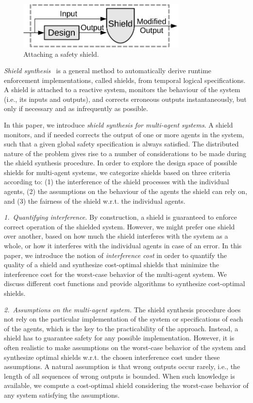 \begin{figure}
\centering
\includegraphics[width=0.75\textwidth]{MultiShield/figs/attach_shield}
\caption{Attaching a safety shield.}
\label{fig:attach_shield}
\vspace{-.3cm}
\end{figure}
\emph{Shield synthesis}~\cite{KonighoferABHKT17} is a general method to automatically derive runtime enforcement implementations, called shields,
from temporal logical specifications.
A shield is attached to a reactive system, monitors the behaviour of the system (i.e., its inputs and outputs), and corrects
erroneous outputs instantaneously, but only if necessary and as infrequently
as possible.


In this paper, we introduce \emph{shield synthesis for multi-agent systems}. A shield monitors, and if needed corrects the output of one or more agents in the system, such that a given global safety specification is always satisfied. The distributed nature of the problem gives rise to a number of considerations to be made during the shield synthesis procedure. In order to explore the design space of possible shields for multi-agent systems, we categorize shields based on three criteria according to:
(1) the interference of the shield processes with the individual agents,
(2) the assumptions on the behaviour of the agents the shield can rely on, and
(3) the fairness of the shield w.r.t. the individual agents.


\emph{1.\ Quantifying interference.}
By construction, a shield is guaranteed to enforce correct operation of the shielded system. However, we might prefer one shield over another, based on how much the shield interferes with the system as a whole, or how it interferes with the individual agents in case of an error. In this paper, we introduce the notion of  \emph{interference cost}
in order to quantify the quality of a shield
and synthesize cost-optimal shields that minimize the interference cost for the worst-case behavior of the multi-agent system.
We discuss different cost functions and provide algorithms to synthesize cost-optimal shields.

\emph{2.\ Assumptions on the multi-agent system.}
The shield synthesis procedure does not rely on the particular implementation of the system or specifications of each of the  agents, which is the key to the practicability of the approach. Instead, a shield has to guarantee safety for any possible implementation.
However, it is often realistic to make assumptions on the worst-case behavior of the system and  synthesize optimal shields w.r.t. the chosen interference cost under these assumptions. A natural assumption is that wrong outputs occur rarely, i.e., the length of all sequences of wrong outputs is bounded.
When such knowledge is available, we compute a cost-optimal shield considering the worst-case behavior of any system satisfying the assumptions.

